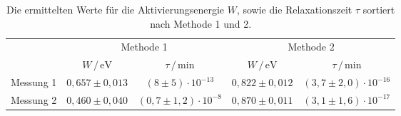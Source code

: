 \begin{table}[h]
    \centering
    \caption{Die ermittelten Werte für die Aktivierungsenergie $W$, sowie die Relaxationszeit $\tau$ sortiert nach Methode 1 und 2.}
    \label{tab:ergebnisse}
    \begin{tabular}{c c c c c}
      \toprule
      &\multicolumn{2}{c}{Methode 1} &\multicolumn{2}{c}{Methode 2}\\
      \cmidrule(lr){2-3}\cmidrule(lr){4-5}
                   &$W \, / \, \si{\electronvolt}$  &$\tau \, / \, \si{\minute}$ & $W \, / \, \si{\electronvolt}$    & $\tau \, / \, \si{\minute}$   \\
      \midrule
      Messung 1    & $0,657 \pm 0,013$              & $(8\pm 5)\cdot 10^{-13}$    & $0,822 \pm 0,012$                 & $(3,7\pm 2,0)\cdot 10^{-16}$  \\   
      Messung 2    & $0,460 \pm 0,040$              & $(0,7\pm 1,2)\cdot 10^{-8}$ & $0,870 \pm 0,011$                 & $(3,1\pm 1,6)\cdot 10^{-17}$  \\   
      \bottomrule
    \end{tabular}
  \end{table}

